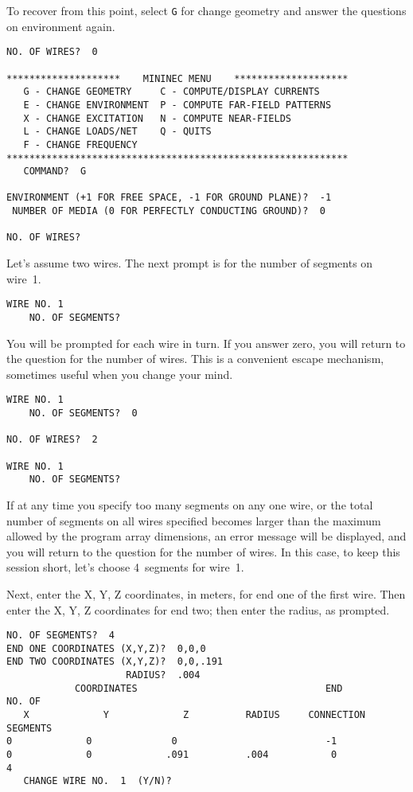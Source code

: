\documentclass[12pt]{article}
\begin{document}
\noindent To recover from this point, select \verb+G+ for change
geometry and answer the questions on environment again.

\begin{Verbatim}
NO. OF WIRES?  0

********************    MININEC MENU    ********************
   G - CHANGE GEOMETRY     C - COMPUTE/DISPLAY CURRENTS
   E - CHANGE ENVIRONMENT  P - COMPUTE FAR-FIELD PATTERNS
   X - CHANGE EXCITATION   N - COMPUTE NEAR-FIELDS
   L - CHANGE LOADS/NET    Q - QUITS
   F - CHANGE FREQUENCY
************************************************************
   COMMAND?  G

ENVIRONMENT (+1 FOR FREE SPACE, -1 FOR GROUND PLANE)?  -1
 NUMBER OF MEDIA (0 FOR PERFECTLY CONDUCTING GROUND)?  0

NO. OF WIRES?
\end{Verbatim}

Let's assume two wires. The next prompt is for the number of segments on
wire~1.

\begin{Verbatim}
WIRE NO. 1
    NO. OF SEGMENTS?
\end{Verbatim}

You will be prompted for each wire in turn. If you answer zero, you will
return to the question for the number of wires. This is a convenient
escape mechanism, sometimes useful when you change your mind.

\begin{Verbatim}
WIRE NO. 1
    NO. OF SEGMENTS?  0

NO. OF WIRES?  2

WIRE NO. 1
    NO. OF SEGMENTS?
\end{Verbatim}

If at any time you specify too many segments on any one wire, or the
total number of segments on all wires specified becomes larger than the
maximum allowed by the program array dimensions, an error message will
be displayed, and you will return to the question for the number of
wires. In this case, to keep this session short, let's choose 4~segments
for wire~1.

Next, enter the X, Y, Z coordinates, in meters, for end one of the first
wire. Then enter the X, Y, Z coordinates for end two; then enter the
radius, as prompted.

\begin{Verbatim}
NO. OF SEGMENTS?  4
END ONE COORDINATES (X,Y,Z)?  0,0,0
END TWO COORDINATES (X,Y,Z)?  0,0,.191
                     RADIUS?  .004
            COORDINATES                                 END         NO. OF
   X             Y             Z          RADIUS     CONNECTION     SEGMENTS
0             0              0                          -1
0             0             .091          .004           0             4
   CHANGE WIRE NO.  1  (Y/N)?
\end{Verbatim}
\end{document}
